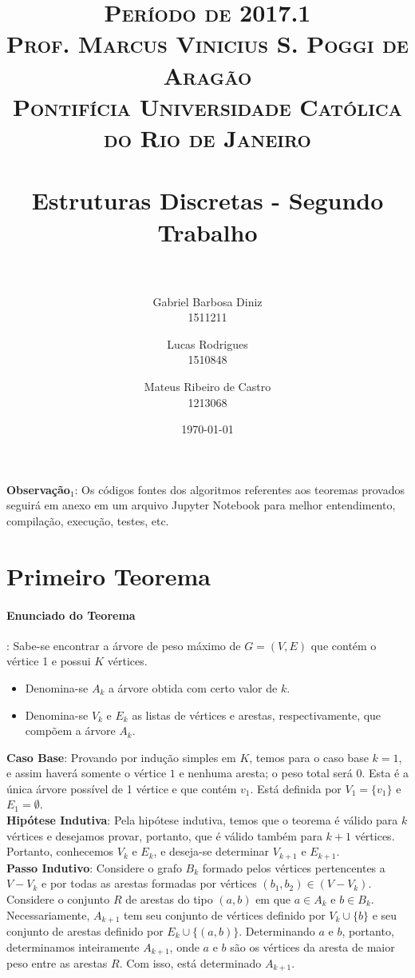 \documentclass[paper=a4, fontsize=11pt]{scrartcl} %
\title{
\normalfont \normalsize 
\textsc{Período de 2017.1} \\
\textsc{Prof. Marcus Vinicius S. Poggi de Aragão} \\
\textsc{Pontifícia Universidade Católica do Rio de Janeiro} \\  [0.5cm] %
\horrule{1pt} \\  %
\LARGE Estruturas Discretas - Segundo Trabalho \\ %
\horrule{2pt} \\ %
}
\author{
\large Gabriel Barbosa Diniz \\
\large 1511211 \and 
\large Lucas Rodrigues \\ 
\large 1510848 \and 
\large Mateus Ribeiro de Castro \\ 
\large 1213068 \\
}
\date{\scshape\normalsize\today} %
\numberwithin{equation}{section} %
\numberwithin{figure}{section} %
\numberwithin{table}{section} %
\begin{document}
\maketitle %

\textbf{Observação$_1$}: Os códigos fontes dos algoritmos referentes aos teoremas provados seguirá em anexo em um arquivo Jupyter Notebook para melhor entendimento, compilação, execução, testes, etc.


\section{Primeiro Teorema}

\paragraph{Enunciado do Teorema}: Sabe-se encontrar a árvore de peso máximo de $G=(V,E)$ que contém o vértice 1 e possui $K$ vértices.

\begin{itemize}
   \item Denomina-se $A_k$ a árvore obtida com certo valor de $k$.
   \item Denomina-se $V_k$ e $E_k$ as listas de vértices e arestas, respectivamente, que compõem a árvore $A_k$.
\end{itemize}

\textbf{Caso Base}: Provando por indução simples em $K$, temos para o caso base $k=1$, e assim haverá somente o vértice $1$ e nenhuma aresta; o peso total será $0$. Esta é a única árvore possível de 1 vértice e que contém $v_1$. Está definida por $V_1 = \{v_1\}$ e $E_1 = \emptyset$.\\

\textbf{Hipótese Indutiva}: Pela hipótese indutiva, temos que o teorema é válido para $k$ vértices e desejamos provar, portanto, que é válido também para $k+1$ vértices. Portanto, conhecemos $V_k$ e $E_k$, e deseja-se determinar $V_{k+1}$ e $E_{k+1}$.\\

\textbf{Passo Indutivo}: Considere o grafo $B_k$ formado pelos vértices pertencentes a $V - V_k$ e por todas as arestas formadas por vértices $(b_1, b_2) \in (V - V_k)$. Considere o conjunto $R$ de arestas do tipo $(a, b)$ em que $a \in A_k$ e $b \in B_k$. Necessariamente, $A_{k+1}$ tem seu conjunto de vértices definido por $V_k \cup \{b\}$ e seu conjunto de arestas definido por $E_k \cup \{(a, b)\}$. Determinando $a$ e $b$, portanto, determinamos inteiramente $A_{k+1}$, onde $a$ e $b$ são os vértices da aresta de maior peso entre as arestas $R$. Com isso, está determinado $A_{k+1}$.\\
\end{document}
